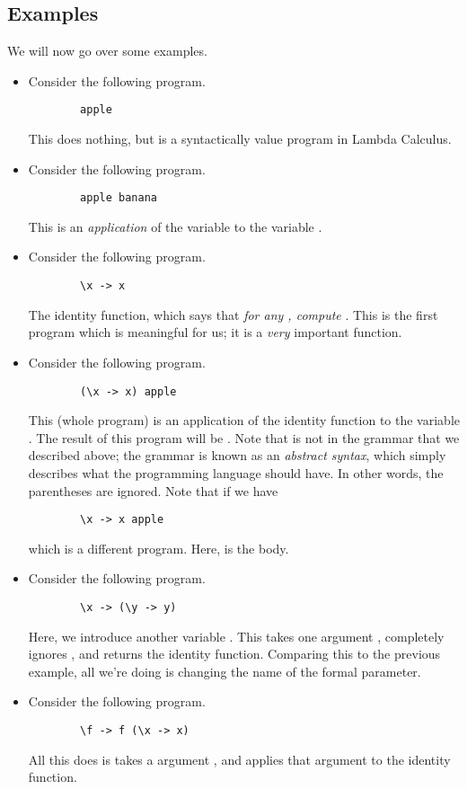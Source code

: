 \documentclass[letterpaper]{article}
\begin{document}
\subsection{Examples}
We will now go over some examples. 
\begin{itemize}
    \item Consider the following program. 
    \begin{verbatim}
        apple
    \end{verbatim}
    This does nothing, but is a syntactically value program in Lambda Calculus.

    \item Consider the following program. 
    \begin{verbatim}
        apple banana
    \end{verbatim}
    This is an \emph{application} of the variable  to the variable .

    \item Consider the following program. 
    \begin{verbatim}
        \x -> x
    \end{verbatim}
    The identity function, which says that \emph{for any , compute }. This is the first program which is meaningful for us; it is a \emph{very} important function. 

    \item Consider the following program.
    \begin{verbatim}
        (\x -> x) apple
    \end{verbatim}
    This (whole program) is an application of the identity function to the variable . The result of this program will be . Note that \code{()} is not in the grammar that we described above; the grammar is known as an \emph{abstract syntax}, which simply describes what the programming language should have. In other words, the parentheses are ignored. Note that if we have 
    \begin{verbatim}
        \x -> x apple 
    \end{verbatim}
    which is a different program. Here,  is the body. 

    \item Consider the following program.
    \begin{verbatim}
        \x -> (\y -> y)
    \end{verbatim}
    Here, we introduce another variable . This takes one argument , completely ignores , and returns the identity function. Comparing this to the previous example, all we're doing is changing the name of the formal parameter. 
    
    \item Consider the following program.
    \begin{verbatim}
        \f -> f (\x -> x)
    \end{verbatim}
    All this does is takes a argument , and applies that argument to the identity function.
\end{itemize}
\end{document}
